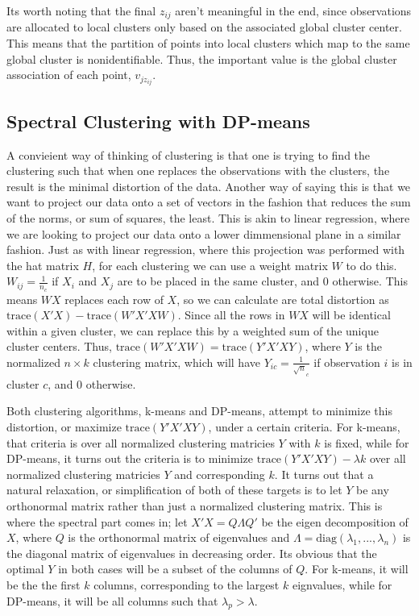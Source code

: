 \documentclass[11pt]{article}
\newcommand{\trace}{\mathrm{trace}}
\newcommand{\diag}{\mathrm{diag}}
\theoremstyle{definition}
\begin{document}
Its worth noting that the final $z_{ij}$ aren't meaningful in the end, since observations are allocated to local clusters only based on the associated global cluster center. This means that the partition of points into local clusters which map to the same global cluster is nonidentifiable. Thus, the important value is the global cluster association of each point, $v_{jz_{ij}}$.
\subsection{Spectral Clustering with DP-means}
A convieient way of thinking of clustering is that one is trying to find the clustering such that when one replaces the observations with the clusters, the result is the minimal distortion of the data. Another way of saying this is that we want to project our data onto a set of vectors in the fashion that reduces the sum of the norms, or sum of squares, the least. This is akin to linear regression, where we are looking to project our data onto a lower dimmensional plane in a similar fashion. Just as with linear regression, where this projection was performed with the hat matrix $H$, for each clustering we can use a weight matrix $W$ to do this. $W_{ij}=\frac{1}{n_c}$ if $X_i$ and $X_j$ are to be placed in the same cluster, and $0$ otherwise. This means $WX$ replaces each row of $X$, so we can calculate are total distortion as $\trace(X'X)-\trace(W'X'XW)$. Since all the rows in $WX$ will be identical within a given cluster, we can replace this by a weighted sum of the unique cluster centers. Thus, $\trace(W'X'XW)=\trace(Y'X'XY)$, where $Y$ is the normalized $n\times k$ clustering matrix, which will have $Y_{ic}=\frac{1}{\sqrt n_c}$ if observation $i$ is in cluster $c$, and 0 otherwise. \par
Both clustering algorithms, k-means and DP-means, attempt to minimize this distortion, or maximize $\trace(Y'X'XY)$, under a certain criteria. For k-means, that criteria is over all normalized clustering matricies $Y$ with $k$ is fixed, while for DP-means, it turns out the criteria is to minimize $\trace(Y'X'XY)-\lambda k$ over all normalized clustering matricies $Y$ and corresponding $k$. It turns out that a natural relaxation, or simplification of both of these targets is to let $Y$ be any orthonormal matrix rather than just a normalized clustering matrix. This is where the spectral part comes in; let $X'X=Q\Lambda Q'$ be the eigen decomposition of $X$, where $Q$ is the orthonormal matrix of eigenvalues and $\Lambda=\diag(\lambda_1,...,\lambda_n)$ is the diagonal matrix of eigenvalues in decreasing order. Its obvious that the optimal $Y$ in both cases will be a subset of the columns of $Q$. For k-means, it will be the the first $k$ columns, corresponding to the largest $k$ eignvalues, while for DP-means, it will be all columns such that $\lambda_p>\lambda$. \par
\end{document}
